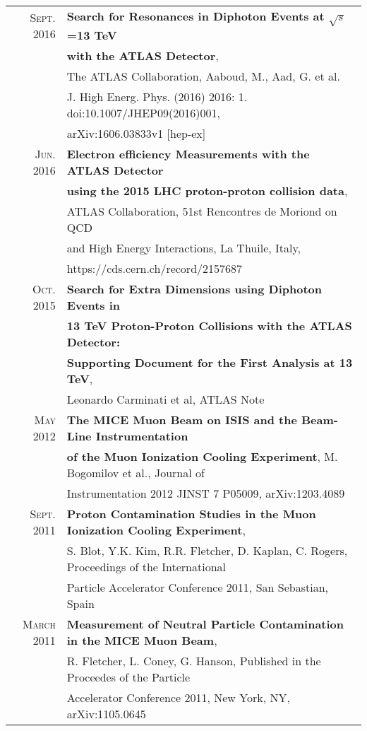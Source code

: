 \documentclass[a4paper,10pt]{article} %
\begin{document}
\begin{tabular}{rl}
\textsc{Sept.} 2016 & \textbf{Search for Resonances in Diphoton Events at $\sqrt{s}$=13 TeV} \\
									& \textbf{with the ATLAS Detector}, \\
									& The ATLAS Collaboration, Aaboud, M., Aad, G. et al.  \\
									& J. High Energ. Phys. (2016) 2016: 1. doi:10.1007/JHEP09(2016)001, \\
									& arXiv:1606.03833v1 [hep-ex] \\
\textsc{Jun.} 2016 & \textbf{Electron efficiency Measurements with the ATLAS Detector} \\
									& \textbf{using the 2015 LHC proton-proton collision data}, \\
									& ATLAS Collaboration, 51st Rencontres de Moriond on QCD \\
									& and High Energy Interactions, La Thuile, Italy, \\
									& https://cds.cern.ch/record/2157687 \\
\textsc{Oct.} 2015 & \textbf{Search for Extra Dimensions using Diphoton Events in} \\
									 & \textbf{13 TeV Proton-Proton Collisions with the ATLAS Detector:} \\
									 & \textbf{Supporting Document for the First Analysis at 13 TeV}, \\
									 & Leonardo Carminati et al, ATLAS Note \\
\textsc{May} 2012  & \textbf{The MICE Muon Beam on ISIS and the Beam-Line Instrumentation} \\
                   & \textbf{of the Muon Ionization Cooling Experiment}, M. Bogomilov et al., Journal of \\
				   & Instrumentation 2012 JINST 7 P05009, arXiv:1203.4089 \\
\textsc{Sept.} 2011 & \textbf{Proton Contamination Studies in the Muon Ionization Cooling Experiment}, \\
					& S. Blot, Y.K. Kim, R.R. Fletcher, D. Kaplan, C. Rogers, Proceedings of the International \\
					& Particle Accelerator Conference 2011, San Sebastian, Spain \\
\textsc{March} 2011 & \textbf{Measurement of Neutral Particle Contamination in the MICE Muon Beam},\\
					& R. Fletcher, L. Coney, G. Hanson, Published in the Proceedes of the Particle \\
                    & Accelerator Conference 2011, New York, NY, arXiv:1105.0645\\

\end{tabular}
\vspace{3mm}
\end{document}
